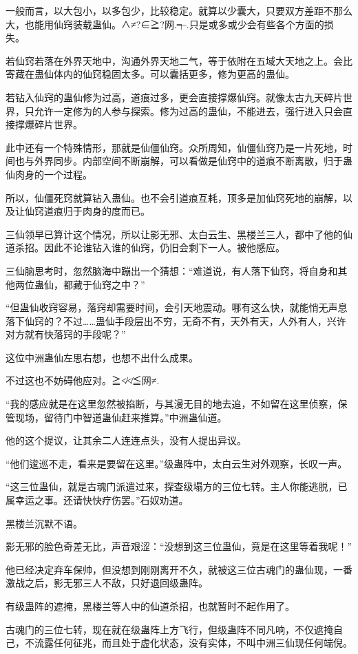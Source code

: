 \begin{this_body}
一般而言，以大包小，以多包少，比较稳定。就算以少囊大，只要双方差距不那么大，也能用仙窍装载蛊仙。∧≠?∈≧?网.┭.只是或多或少会有些各个方面的损失。

若仙窍若落在外界天地中，沟通外界天地二气，等于依附在五域大天地之上。会比寄藏在蛊仙体内的仙窍稳固太多。可以囊括更多，修为更高的蛊仙。

若钻入仙窍的蛊仙修为过高，道痕过多，更会直接撑爆仙窍。就像太古九天碎片世界，只允许一定修为的人参与探索。修为过高的蛊仙，不能进去，强行进入只会直接撑爆碎片世界。

此中还有一个特殊情形，那就是仙僵仙窍。众所周知，仙僵仙窍乃是一片死地，时间也与外界同步。内部空间不断崩解，可以看做是仙窍中的道痕不断离散，归于蛊仙肉身的一个过程。

所以，仙僵死窍就算钻入蛊仙。也不会引道痕互耗，顶多是加仙窍死地的崩解，以及让仙窍道痕归于肉身的度而已。

三仙领早已算计这个情况，所以让影无邪、太白云生、黑楼兰三人，都中了他的仙道杀招。因此不论谁钻入谁的仙窍，仍旧会剩下一人。被他感应。

三仙脑思考时，忽然脑海中蹦出一个猜想：“难道说，有人落下仙窍，将自身和其他两位蛊仙，都藏于仙窍之中？”

“但蛊仙收窍容易，落窍却需要时间，会引天地震动。哪有这么快，就能悄无声息落下仙窍的？不过……蛊仙手段层出不穷，无奇不有，天外有天，人外有人，兴许对方就有快落窍的手段呢？”

这位中洲蛊仙左思右想，也想不出什么成果。

不过这也不妨碍他应对。≧≮≮≦网≠.

“我的感应就是在这里忽然被掐断，与其漫无目的地去追，不如留在这里侦察，保管现场，留待门中智道蛊仙赶来推算。”中洲蛊仙道。

他的这个提议，让其余二人连连点头，没有人提出异议。

“他们逡巡不走，看来是要留在这里。”级蛊阵中，太白云生对外观察，长叹一声。

“这三位蛊仙，就是古魂门派遣过来，探查级塌方的三位七转。主人你能逃脱，已属幸运之事。还请快快疗伤罢。”石奴劝道。

黑楼兰沉默不语。

影无邪的脸色奇差无比，声音艰涩：“没想到这三位蛊仙，竟是在这里等着我呢！”

他已经决定弃车保帅，但没想到刚刚离开不久，就被这三位古魂门的蛊仙现，一番激战之后，影无邪三人不敌，只好退回级蛊阵。

有级蛊阵的遮掩，黑楼兰等人中的仙道杀招，也就暂时不起作用了。

古魂门的三位七转，现在就在级蛊阵上方飞行，但级蛊阵不同凡响，不仅遮掩自己，不流露任何征兆，而且处于虚化状态，没有实体，不叫中洲三仙现任何端倪。


\end{this_body}
